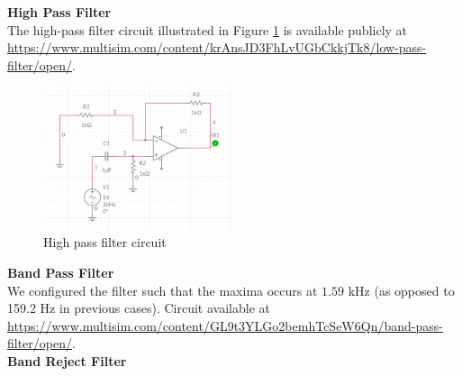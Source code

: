 \documentclass{article}
\begin{document}
	\textbf{High Pass Filter}\\
	
	The high-pass filter circuit illustrated in Figure \ref{fig:high_pass_circuit} is available publicly at \url{https://www.multisim.com/content/krAnsJD3FhLvUGbCkkjTk8/low-pass-filter/open/}.\\
	
	\begin{figure}[h!]
		\centering
		\includegraphics[width=0.5\textwidth]{high_pass_circuit}
		\caption{High pass filter circuit}
		\label{fig:high_pass_circuit}
	\end{figure}
	
	\pagebreak \textbf{Band Pass Filter}\\
	
	We configured the filter such that the maxima occurs at $1.59$ kHz (as opposed to 159.2 Hz in previous cases). Circuit available at \url{https://www.multisim.com/content/GL9t3YLGo2bemhTcSeW6Qn/band-pass-filter/open/}.\\
	
	\textbf{Band Reject Filter}
	
\end{document}
